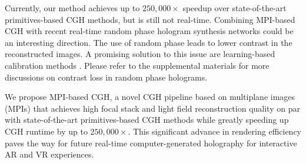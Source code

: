 Currently, our method achieves up to $250,000\times$ speedup over state-of-the-art primitives-based CGH methods, but is still not real-time. Combining MPI-based CGH with recent real-time random phase hologram synthesis networks \cite{artifact2025chu} could be an interesting direction. The use of random phase leads to lower contrast in the reconstructed images. A promising solution to this issue are learning-based calibration methods \cite{peng2020neural, choi2022time, jang2024waveguide, choi2025sah}. Please refer to the supplemental materials for more discussions on contrast loss in random phase holograms.

 We propose MPI-based CGH, a novel CGH pipeline based on multiplane images (MPIs) that achieves high focal stack and light field reconstruction quality on par with state-of-the-art primitives-based CGH methods while greatly speeding up CGH runtime by up to $250,000\times$. This significant advance in rendering efficiency paves the way for future real-time computer-generated holography for interactive AR and VR experiences.

